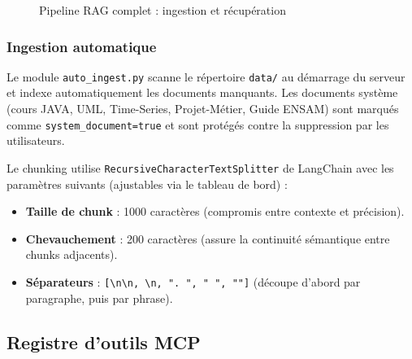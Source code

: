 \documentclass[12pt, a4paper]{article}
\begin{document}
\begin{figure}[H]
\caption{Pipeline RAG complet : ingestion et récupération}
\label{fig:rag_pipeline}
\end{figure}

\subsubsection{Ingestion automatique}

Le module \texttt{auto\_ingest.py} scanne le répertoire \texttt{data/} au démarrage du serveur et indexe automatiquement les documents manquants. Les documents système (cours JAVA, UML, Time-Series, Projet-Métier, Guide ENSAM) sont marqués comme \texttt{system\_document=true} et sont protégés contre la suppression par les utilisateurs.

Le chunking utilise \texttt{RecursiveCharacterTextSplitter} de LangChain avec les paramètres suivants (ajustables via le tableau de bord) :
\begin{itemize}
  \item \textbf{Taille de chunk} : 1000 caractères (compromis entre contexte et précision).
  \item \textbf{Chevauchement} : 200 caractères (assure la continuité sémantique entre chunks adjacents).
  \item \textbf{Séparateurs} : \texttt{[\textbackslash n\textbackslash n, \textbackslash n, ". ", " ", ""]} (découpe d'abord par paragraphe, puis par phrase).
\end{itemize}

\subsection{Registre d'outils MCP}
\end{document}
